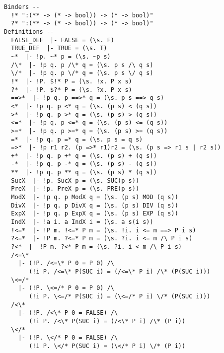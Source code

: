 {\begin{verbatim}
Binders --
  !* ":(** -> (* -> bool)) -> (* -> bool)"
  ?* ":(** -> (* -> bool)) -> (* -> bool)"     
Definitions --
  FALSE_DEF  |- FALSE = (\s. F)
  TRUE_DEF  |- TRUE = (\s. T)
  ~*  |- !p. ~* p = (\s. ~p s)
  /\*  |- !p q. p /\* q = (\s. p s /\ q s)
  \/*  |- !p q. p \/* q = (\s. p s \/ q s)
  !*  |- !P. $!* P = (\s. !x. P x s)
  ?*  |- !P. $?* P = (\s. ?x. P x s)
  ==>*  |- !p q. p ==>* q = (\s. p s ==> q s)
  <*  |- !p q. p <* q = (\s. (p s) < (q s))
  >*  |- !p q. p >* q = (\s. (p s) > (q s))
  <=*  |- !p q. p <=* q = (\s. (p s) <= (q s))
  >=*  |- !p q. p >=* q = (\s. (p s) >= (q s))
  =*  |- !p q. p =* q = (\s. p s = q s)
  =>*  |- !p r1 r2. (p =>* r1)r2 = (\s. (p s => r1 s | r2 s))
  +*  |- !p q. p +* q = (\s. (p s) + (q s))
  -*  |- !p q. p -* q = (\s. (p s) - (q s))
  **  |- !p q. p ** q = (\s. (p s) * (q s))
  SucX  |- !p. SucX p = (\s. SUC(p s))
  PreX  |- !p. PreX p = (\s. PRE(p s))
  ModX  |- !p q. p ModX q = (\s. (p s) MOD (q s))
  DivX  |- !p q. p DivX q = (\s. (p s) DIV (q s))
  ExpX  |- !p q. p ExpX q = (\s. (p s) EXP (q s))
  IndX  |- !a i. a IndX i = (\s. a s(i s))
  !<=*  |- !P m. !<=* P m = (\s. !i. i <= m ==> P i s)
  ?<=*  |- !P m. ?<=* P m = (\s. ?i. i <= m /\ P i s)
  ?<*  |- !P m. ?<* P m = (\s. ?i. i < m /\ P i s)
  /<=\*
    |- (!P. /<=\* P 0 = P 0) /\
       (!i P. /<=\* P(SUC i) = (/<=\* P i) /\* (P(SUC i)))
  \<=/*
    |- (!P. \<=/* P 0 = P 0) /\
       (!i P. \<=/* P(SUC i) = (\<=/* P i) \/* (P(SUC i)))
  /<\*
    |- (!P. /<\* P 0 = FALSE) /\
       (!i P. /<\* P(SUC i) = (/<\* P i) /\* (P i))
  \</*
    |- (!P. \</* P 0 = FALSE) /\
       (!i P. \</* P(SUC i) = (\</* P i) \/* (P i))
  

\end{verbatim}}
